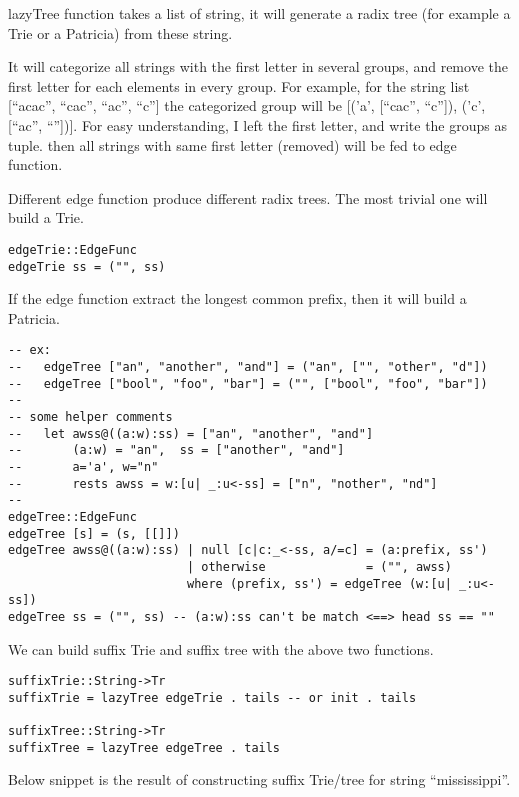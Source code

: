 \documentclass{article}
\begin{document}
lazyTree function takes a list of string, it will generate a radix
tree (for example a Trie or a Patricia) from these string.

It will categorize all strings with the first letter in several groups, 
and remove the first letter for each elements in every group.
For example, for the string list [``acac'', ``cac'', ``ac'', ``c'']
the categorized group will be [('a', [``cac'', ``c'']), ('c', [``ac'', ``''])].
For easy understanding, I left the first letter, and write the groups
as tuple. then all strings with same first letter (removed) will
be fed to edge function.

Different edge function produce different radix trees. The most trivial
one will build a Trie.

\begin{lstlisting}
edgeTrie::EdgeFunc
edgeTrie ss = ("", ss)
\end{lstlisting}

If the edge function extract the longest common prefix, then it will 
build a Patricia.

\begin{lstlisting}
-- ex: 
--   edgeTree ["an", "another", "and"] = ("an", ["", "other", "d"])
--   edgeTree ["bool", "foo", "bar"] = ("", ["bool", "foo", "bar"])
--
-- some helper comments
--   let awss@((a:w):ss) = ["an", "another", "and"]
--       (a:w) = "an",  ss = ["another", "and"]
--       a='a', w="n"
--       rests awss = w:[u| _:u<-ss] = ["n", "nother", "nd"]
--
edgeTree::EdgeFunc
edgeTree [s] = (s, [[]])
edgeTree awss@((a:w):ss) | null [c|c:_<-ss, a/=c] = (a:prefix, ss')
                         | otherwise              = ("", awss)
                         where (prefix, ss') = edgeTree (w:[u| _:u<-ss])
edgeTree ss = ("", ss) -- (a:w):ss can't be match <==> head ss == ""
\end{lstlisting}

We can build suffix Trie and suffix tree with the above two functions.

\begin{lstlisting}
suffixTrie::String->Tr
suffixTrie = lazyTree edgeTrie . tails -- or init . tails

suffixTree::String->Tr
suffixTree = lazyTree edgeTree . tails
\end{lstlisting}

Below snippet is the result of constructing suffix Trie/tree for
string ``mississippi''.
\end{document}
